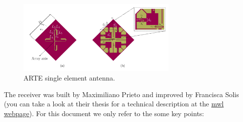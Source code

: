 \begin{figure}
    \centering
    \includegraphics[width=0.7\textwidth]{images/arte_antenna_element.png}
    \caption{ARTE single element antenna.}
    \label{fig:arte_element}
\end{figure}




The receiver was built by Maximiliano Prieto and improved by Francisca Solis (you can take a look at their thesis for a technical description at the \href{http://www.das.uchile.cl/lab_mwl/publications.html}{mwl webpage}). For this document we only refer to the some key points:
